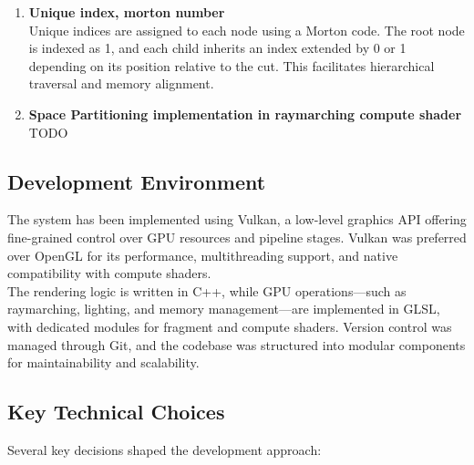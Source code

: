 \documentclass{rapportcs}
\begin{document}
\begin{enumerate}
            \newpage
            
            \item \textbf{Unique index, morton number}\\
            Unique indices are assigned to each node using a Morton code.
            The root node is indexed as 1, and each child inherits an index extended by 0 or 1 depending on its position relative to the cut.
            This facilitates hierarchical traversal and memory alignment.\\
            
            \item \textbf{Space Partitioning implementation in raymarching compute shader}\\
            TODO
            
        \end{enumerate}
    
    \newpage
    
    \subsection{Development Environment}
        The system has been implemented using Vulkan, a low-level graphics API offering fine-grained control over GPU resources and pipeline stages.
        Vulkan was preferred over OpenGL for its performance, multithreading support, and native compatibility with compute shaders. \\

        The rendering logic is written in C++, while GPU operations—such as raymarching, lighting, and memory management—are implemented in GLSL, with dedicated modules for fragment and compute shaders.
        Version control was managed through Git, and the codebase was structured into modular components for maintainability and scalability.
    
    \subsection{Key Technical Choices}
        Several key decisions shaped the development approach:\\
        
\end{document}
